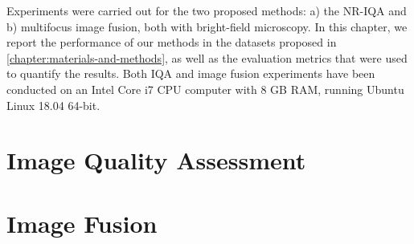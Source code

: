 Experiments were carried out for the two proposed methods: a) the NR-IQA  and b) multifocus image fusion, both with bright-field microscopy. In this chapter, we report the performance of our methods in the datasets proposed in \autoref{chapter:materials-and-methods}, as well as the evaluation metrics that were used to quantify the results. Both IQA and image fusion experiments have been conducted on an Intel Core i7 CPU computer with 8 GB RAM, running Ubuntu Linux 18.04 64-bit.



\section{Image Quality Assessment}


\section{Image Fusion}
